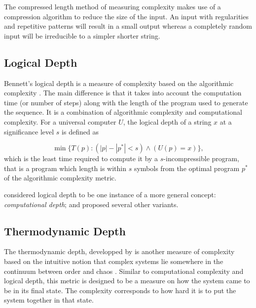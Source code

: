 The compressed length method of measuring complexity makes use of a compression
algorithm to reduce the size of the input. An input with regularities and
repetitive patterns will result in a small output whereas a completely random
input will be irreducible to a simpler shorter string.


\subsection{Logical Depth}

Bennett's logical depth is a measure of complexity based on the algorithmic
complexity \parencite{bennettDissipationInformationComputational1988,
  bennettLogicalDepthPhysical1995}. The main difference is that it takes into
account the computation time (or number of steps) along with the length of the
program used to generate the sequence. It is a combination of algorithmic
complexity and computational complexity. For a universal computer $U$, the
logical depth of a string $x$ at a significance level $s$ is defined as

\begin{equation}
  \label{eq:2}
  \min\{T(p): (|p| - |p^{*}| < s ) \wedge (U(p) = x) \},
\end{equation}
which is the least time required to compute it by a $s$-incompressible program,
that is a program which length is within $s$ symbols from the optimal program
$p^{*}$ of the algorithmic complexity metric.

\textcite{antunesComputationalDepthConcept2006} considered logical depth to be
one instance of a more general concept: \emph{computational depth}; and proposed
several other variants.

\subsection{Thermodynamic Depth}

The thermodynamic depth, developped by
\textcite{lloydComplexityThermodynamicDepth1988} is another measure of
complexity based on the intuitive notion that complex systems lie somewhere in
the continuum between order and chaos
\parencite{chaitinInformationRandomnessIncompleteness1990,
  ceccattoComplexityHierarchicalSystems1988, deutschQuantumTheoryChurch1985}.
Similar to computational complexity and logical depth, this metric is designed
to be a measure on how the system came to be in its final state. The complexity
corresponds to how hard it is to put the system together in that state.

